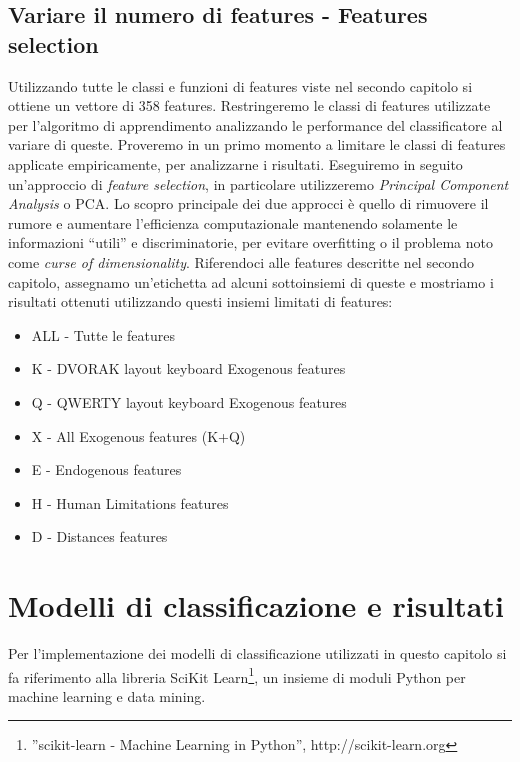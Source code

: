 \subsection{Variare il numero di features - Features selection}
Utilizzando tutte le classi e funzioni di features viste nel secondo capitolo si ottiene un vettore di 358 features. Restringeremo le classi di features utilizzate per l'algoritmo di apprendimento analizzando le performance del classificatore al variare di queste. Proveremo in un primo momento a limitare le classi di features applicate empiricamente, per analizzarne i risultati. Eseguiremo in seguito un'approccio di \textit{feature selection}, in particolare utilizzeremo \textit{Principal Component Analysis} o PCA. Lo scopro principale dei due approcci è quello di rimuovere il rumore e aumentare l'efficienza computazionale mantenendo solamente le informazioni “utili” e discriminatorie, per evitare overfitting o il problema noto come \textit{curse of dimensionality}.
Riferendoci alle features descritte nel secondo capitolo, assegnamo un'etichetta ad alcuni sottoinsiemi di queste e mostriamo i risultati ottenuti utilizzando questi insiemi limitati di features:

\begin{itemize}
	\item ALL - Tutte le features
	\item K - DVORAK layout keyboard Exogenous features
	\item Q - QWERTY layout keyboard Exogenous features
	\item X - All Exogenous features (K+Q)
	\item E - Endogenous features
	\item H - Human Limitations features
	\item D - Distances features
\end{itemize}


\section{Modelli di classificazione e risultati}
Per l'implementazione dei modelli di classificazione utilizzati in questo capitolo si fa riferimento alla libreria SciKit Learn\footnote{”scikit-learn - Machine Learning in Python”, http://scikit-learn.org}, un insieme di moduli Python per machine learning e data mining.

